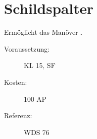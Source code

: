 \section{Schildspalter}
\label{sf.schildspalter}
Ermöglicht das Manöver .
\begin{description}
    \item[Voraussetzung:]
        KL 15, SF 
    \item [Kosten:]
        100 AP
    \item [Referenz:]
        WDS 76
\end{description}
